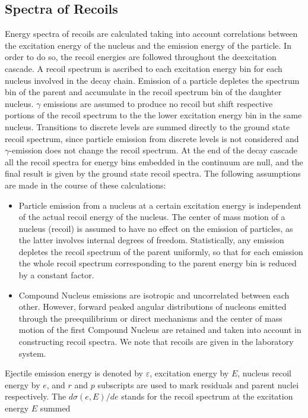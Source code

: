 \documentclass[twocolumn,amsmath,amssymb,10pt,groupedaddress,a4paper]{revtex4}
\begin{document}
\subsection{Spectra of Recoils}
Energy spectra of recoils are calculated taking into account correlations
between the excitation energy of the nucleus and the emission energy
of the particle. In order to do so, the recoil energies are followed
throughout the deexcitation cascade. A recoil spectrum is ascribed
to each excitation energy bin for each nucleus involved in the decay
chain. Emission of a particle depletes the spectrum bin of the parent
and accumulate in the recoil spectrum bin of the daughter nucleus.
$\gamma$ emissions are assumed to produce no recoil but shift respective
portions of the recoil spectrum to the the lower excitation energy
bin in the same nucleus. Transitions to discrete levels are summed
directly to the ground state recoil spectrum, since particle emission
from discrete levels is not considered and $\gamma$-emission does
not change the recoil spectrum. At the end of the decay cascade all
the recoil spectra for energy bins embedded in the continuum are null,
and the final result is given by the ground state recoil spectra.
The following assumptions are made in the course of these calculations:
\begin{itemize}
\item Particle emission from a nucleus at a certain excitation energy is
independent of the actual recoil energy of the nucleus. The center
of mass motion of a nucleus (recoil) is assumed to have no effect
on the emission of particles, as the latter involves internal degrees
of freedom. Statistically, any emission depletes the recoil spectrum
of the parent uniformly, so that for each emission the whole recoil
spectrum corresponding to the parent energy bin is reduced by a constant
factor.
\item Compound Nucleus emissions are isotropic and uncorrelated between
each other. However, forward peaked angular distributions of nucleons
emitted through the preequilibrium or direct mechanisms and the center
of mass motion of the first Compound Nucleus are retained and taken
into account in constructing recoil spectra. We note that recoils
are given in the laboratory system.
\end{itemize}
Ejectile emission energy is denoted by $\varepsilon$, excitation
energy by $E$, nucleus recoil energy by $e$, and $r$ and $p$ subscripts
are used to mark residuals and parent nuclei respectively. The $d\sigma(e,E)/de$
stands for the recoil spectrum at the excitation energy $E$ summed
\end{document}
